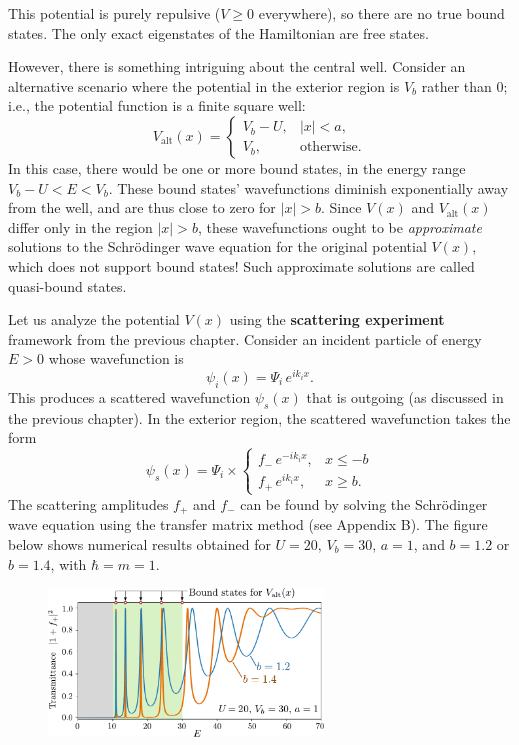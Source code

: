 \documentclass[pra,12pt]{revtex4}
\begin{document}
\noindent
This potential is purely repulsive ($V \ge 0$ everywhere), so there
are no true bound states.  The only exact eigenstates of the
Hamiltonian are free states.

However, there is something intriguing about the central well.
Consider an alternative scenario where the potential in the exterior
region is $V_b$ rather than $0$; i.e., the potential function is a
finite square well:
\begin{equation}
  V_{\mathrm{alt}}(x) = \begin{cases}V_b - U, & |x| < a, \\ V_b, & \mathrm{otherwise}.\end{cases}
\end{equation}
In this case, there would be one or more bound states, in the energy
range $V_b-U < E < V_b$.  These bound states' wavefunctions diminish
exponentially away from the well, and are thus close to zero for $|x|
> b$.  Since $V(x)$ and $V_{\mathrm{alt}}(x)$ differ only in the
region $|x| > b$, these wavefunctions ought to be \textit{approximate}
solutions to the Schr\"odinger wave equation for the original
potential $V(x)$, which does not support bound states!  Such
approximate solutions are called quasi-bound states.

Let us analyze the potential $V(x)$ using the \textbf{scattering
  experiment} framework from the previous chapter.  Consider an
incident particle of energy $E > 0$ whose wavefunction is
\begin{equation}
  \psi_i(x) = \Psi_i \, e^{ik_i x}.
\end{equation}
This produces a scattered wavefunction $\psi_s(x)$ that is outgoing
(as discussed in the previous chapter).  In the exterior region, the
scattered wavefunction takes the form
\begin{equation}
  \psi_s(x) = \Psi_i \times \begin{cases}f_- \,e^{-ik_ix}, & x \le -b \\ f_+ \,e^{ik_ix}, & x \ge b.\end{cases}
\end{equation}
The scattering amplitudes $f_+$ and $f_-$ can be found by solving the
Schr\"odinger wave equation using the transfer matrix method (see
Appendix B).  The figure below shows numerical results obtained for $U
= 20,\,V_b = 30,\,a=1$, and $b = 1.2$ or $b = 1.4$, with $\hbar = m =
1$.

\begin{figure}[h]
  \centering\includegraphics[width=0.65\textwidth]{resonances}
\end{figure}
\end{document}
